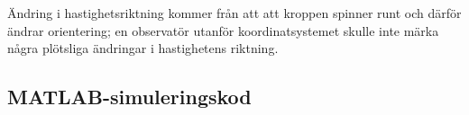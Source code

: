 \documentclass[12pt,a4paper]{article}
\begin{document}
		Ändring i hastighetsriktning kommer från att att kroppen spinner runt och därför
		ändrar orientering; en observatör utanför koordinatsystemet skulle inte märka
		några plötsliga ändringar i hastighetens riktning.
		
\begin{appendix}
	\section{MATLAB-simuleringskod}
	
		
		
		\begin{framed}
			
		\end{framed}
		
\end{appendix}
\end{document}
